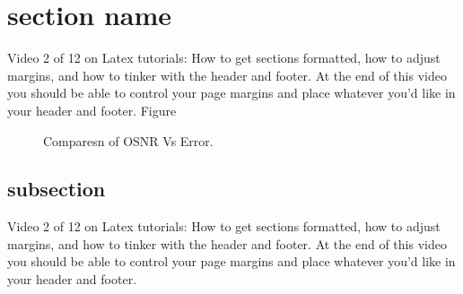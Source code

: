 \documentclass[12pt]{report}
\begin{document}
\section{section name}
Video 2 of 12 on Latex tutorials: How to get sections formatted, how to adjust margins, and how to tinker with the header and footer. At the end of this video you should be able to control your page margins and place whatever you'd like in your header and footer. Figure
\begin{figure}[htbp]
	\caption{Comparesn of OSNR Vs Error.}
	\label{fig1}
\end{figure}

\subsection*{subsection}
Video 2 of 12 on Latex tutorials: How to get sections formatted, how to adjust margins, and how to tinker with the header and footer. At the end of this video you should be able to control your page margins and place whatever you'd like in your header and footer.
\end{document}

